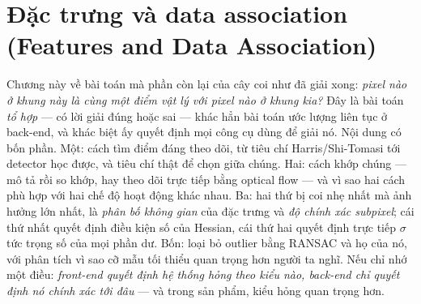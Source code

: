 \documentclass[../../vslam.tex]{subfiles}
\begin{document}
\chapter{Đặc trưng và data association (Features and Data Association)}

\begin{tomtat}
Chương này về bài toán mà phần còn lại của cây coi như đã giải xong: \emph{pixel nào ở khung này là cùng một điểm vật lý với pixel nào ở khung kia?} Đây là bài toán \emph{tổ hợp} --- có lời giải đúng hoặc sai --- khác hẳn bài toán ước lượng liên tục ở back-end, và khác biệt ấy quyết định mọi công cụ dùng để giải nó. Nội dung có bốn phần. Một: cách tìm điểm đáng theo dõi, từ tiêu chí Harris/Shi-Tomasi tới detector học được, và tiêu chí thật để chọn giữa chúng. Hai: cách khớp chúng --- mô tả rồi so khớp, hay theo dõi trực tiếp bằng optical flow --- và vì sao hai cách phù hợp với hai chế độ hoạt động khác nhau. Ba: hai thứ bị coi nhẹ nhất mà ảnh hưởng lớn nhất, là \emph{phân bố không gian} của đặc trưng và \emph{độ chính xác subpixel}; cái thứ nhất quyết định điều kiện số của Hessian, cái thứ hai quyết định trực tiếp \(\sigma\) tức trọng số của mọi phần dư. Bốn: loại bỏ outlier bằng RANSAC và họ của nó, với phân tích vì sao cỡ mẫu tối thiểu quan trọng hơn người ta nghĩ. Nếu chỉ nhớ một điều: \emph{front-end quyết định hệ thống hỏng theo kiểu nào, back-end chỉ quyết định nó chính xác tới đâu} --- và trong sản phẩm, kiểu hỏng quan trọng hơn.
\end{tomtat}
\end{document}
